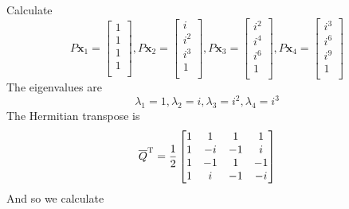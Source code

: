 \documentclass[a4paper]{article}
\begin{document}
Calculate
\[
	P \bm{x}_{1} =
	\begin{bmatrix}
		1 \\
		1 \\
		1 \\
		1 \\
	\end{bmatrix},
	P \bm{x}_{2} =
	\begin{bmatrix}
		i \\
		i^{2} \\
		i^{3} \\
		1 \\
	\end{bmatrix},
	P \bm{x}_{3} =
	\begin{bmatrix}
		i^{2} \\
		i^{4} \\
		i^{6} \\
		1 \\
	\end{bmatrix},
	P \bm{x}_{4} =
	\begin{bmatrix}
		i^{3} \\
		i^{6} \\
		i^{9} \\
		1 \\
	\end{bmatrix}
\]
The eigenvalues are
\[
	\lambda_{1} = 1, \lambda_{2} = i, \lambda_{3} = i^{2}, \lambda_{4} = i^{3}
\]
The Hermitian transpose is
\[
	\overline{Q}^{\textsc{T}} = \frac{1}{2}
	\begin{bmatrix}
		1 & 1 & 1 & 1 \\
		1 & -i & -1 & i \\
		1 & -1 & 1 & -1 \\
		1 & i & -1 & -i \\
	\end{bmatrix}
\]
And so we calculate
\end{document}
